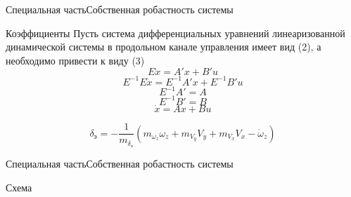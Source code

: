  
\begin{frame}{Специальная часть}{Собственная робастность системы}
    \begin{block}{Коэффициенты}
        Пусть система дифференциальных уравнений линеаризованной динамической системы в продольном канале управления 
        имеет вид (2), а необходимо привести к виду (3)
        \begin{equation}
            \label{ESS}
            E \dot{x} = A'x + B'u
        \end{equation}
        $$E^{-1}E \dot{x}= E^{-1}A'x + E^{-1}B'u$$
        $$E^{-1}A' = A$$
        $$E^{-1}B' = B$$
        \begin{equation}
            \label{SS}
            \dot{x} = Ax+Bu
        \end{equation}
    \end{block}
    $$\delta_\text{э}= -\frac{1}{m_{\delta_\text{э}}} (m_{\omega_z} \omega_z + m_{V_y} V_y + m_{V_x} V_x - \dot{\omega}_z)$$ 
\end{frame}

\begin{frame}{Специальная часть}{Собственная робастность системы}
    \begin{block}{Схема}
    \end{block}
\end{frame}

